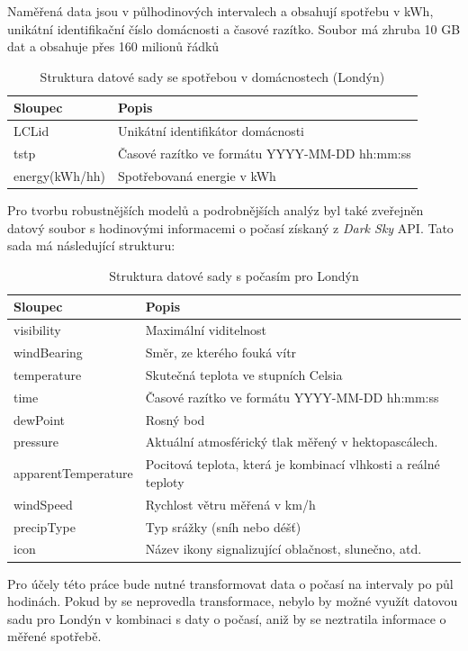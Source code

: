 \documentclass[FM,BP,fonts]{tulthesis}
\begin{document}
Naměřená data jsou v půlhodinových intervalech a obsahují spotřebu v kWh, unikátní identifikační číslo domácnosti a časové razítko. Soubor má zhruba 10 GB dat a obsahuje přes 160 milionů řádků

\begin{table}[!ht]
	\centering
	\caption{Struktura datové sady se spotřebou v domácnostech (Londýn)}
	\begin{tabular}{ll}
		\hline
		\textbf{Sloupec} & \textbf{Popis} \\ \hline
		LCLid & Unikátní identifikátor domácnosti \\ 
		tstp & Časové razítko ve formátu YYYY-MM-DD hh:mm:ss \\ 
		energy(kWh/hh) & Spotřebovaná energie v kWh \\ 
		\hline
	\end{tabular}
\end{table}

Pro tvorbu robustnějších modelů a podrobnějších analýz byl také zveřejněn datový soubor s hodinovými informacemi o počasí získaný z \textit{Dark Sky} API. Tato sada má následující strukturu:


\begin{table}[!ht]
	\centering
	\caption{Struktura datové sady s počasím pro Londýn}
	\begin{tabular}{ll}
		\hline
		\textbf{Sloupec} & \textbf{Popis} \\ \hline
		visibility & Maximální viditelnost \\ 
		windBearing & Směr, ze kterého fouká vítr \\ 
		temperature & Skutečná teplota ve stupních Celsia \\ 
		time & Časové razítko ve formátu YYYY-MM-DD hh:mm:ss	 \\ 
		dewPoint & Rosný bod \\ 
		pressure & Aktuální atmosférický tlak měřený v hektopascálech. \\ 
		apparentTemperature & Pocitová teplota, která je kombinací vlhkosti a reálné teploty \\ 
		windSpeed & Rychlost větru měřená v km/h \\ 
		precipType & Typ srážky (sníh nebo déšť) \\
		icon & Název ikony signalizující oblačnost, slunečno, atd.  \\ 
		\hline
	\end{tabular}
\end{table}

Pro účely této práce bude nutné transformovat data o počasí na intervaly po půl hodinách. Pokud by se neprovedla transformace, nebylo by možné využít datovou sadu pro Londýn v kombinaci s daty o počasí, aniž by se neztratila informace o měřené spotřebě.
\end{document}
